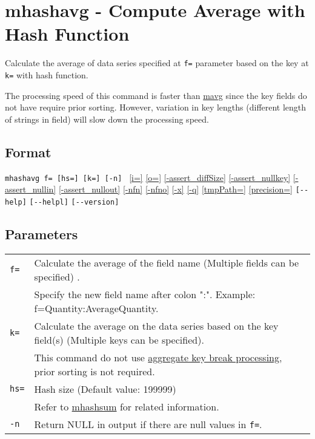
%

\section{mhashavg - Compute Average with Hash Function\label{sect:mhashavg}}
Calculate the average of data series specified at \verb|f=| parameter based on the key at \verb|k=| with hash function. 

The processing speed of this command is faster than \hyperref[sect:avg]{mavg} since the key fields do not have require  prior sorting. However, variation in key lengths (different length of strings in field) will slow down the processing speed. 

\subsection*{Format}
\verb|mhashavg f= [hs=] [k=] [-n] |
\hyperref[sect:option_i]{[i=]}
\hyperref[sect:option_o]{[o=]}
\hyperref[sect:option_assert_diffSize]{[-assert\_diffSize]}
\hyperref[sect:option_assert_nullkey]{[-assert\_nullkey]}
\hyperref[sect:option_assert_nullin]{[-assert\_nullin]}
\hyperref[sect:option_assert_nullout]{[-assert\_nullout]}
\hyperref[sect:option_nfn]{[-nfn]} 
\hyperref[sect:option_nfno]{[-nfno]}  
\hyperref[sect:option_x]{[-x]}
\hyperref[sect:option_q]{[-q]}
\hyperref[sect:option_option_tmppath]{[tmpPath=]}
\hyperref[sect:option_precision]{[precision=]}
\verb|[--help]|
\verb|[--helpl]|
\verb|[--version]|\\

\subsection*{Parameters}
\begin{table}[htbp]
{\small
\begin{tabular}{ll}
\verb|f=|    & Calculate the average of the field name (Multiple fields can be specified) . \\
             & Specify the new field name after colon ":". Example:  f=Quantity:AverageQuantity. \\
\verb|k=|    & Calculate the average on the data series based on the key field(s) (Multiple keys can be specified). \\
   	& This command do not use \hyperref[sect:option_k]{aggregate key break processing}, prior sorting is not required.\\
\verb|hs=|   & Hash size (Default value: 199999)\\
             & Refer to \href{run:mhashsum.pdf}{mhashsum} for related information.\\
\verb|-n|    & Return NULL in output if there are null values in \verb|f=|. \\
\end{tabular} 
}
\end{table} 


